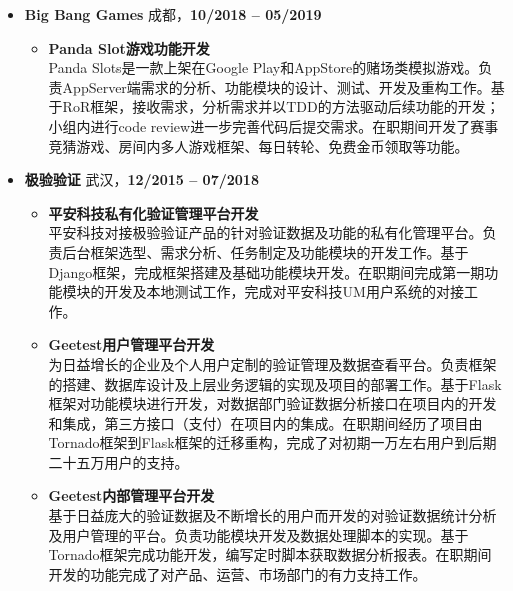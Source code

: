 \documentclass[11pt, a4paper,sans]{moderncv}     %
\begin{document}
\begin{itemize}

  \item{\yahei \textbf{Big Bang Games} \hfill 成都，\textbf{10/2018 -- 05/2019}}

  \begin{itemize}
    \item{\yahei \textbf{Panda Slot游戏功能开发}\\
    Panda Slots是一款上架在Google Play和AppStore的赌场类模拟游戏。负责AppServer端需求的分析、功能模块的设计、测试、开发及重构工作。基于RoR框架，接收需求，分析需求并以TDD的方法驱动后续功能的开发；小组内进行code review进一步完善代码后提交需求。在职期间开发了赛事竞猜游戏、房间内多人游戏框架、每日转轮、免费金币领取等功能。}
  \end{itemize}
  \vspace{6pt}

  \item{\yahei \textbf{极验验证} \hfill 武汉，\textbf{12/2015 -- 07/2018}}

  \begin{itemize}
    \item{\yahei \textbf{平安科技私有化验证管理平台开发}\\
    平安科技对接极验验证产品的针对验证数据及功能的私有化管理平台。负责后台框架选型、需求分析、任务制定及功能模块的开发工作。基于Django框架，完成框架搭建及基础功能模块开发。在职期间完成第一期功能模块的开发及本地测试工作，完成对平安科技UM用户系统的对接工作。}

    \item{\yahei \textbf{Geetest用户管理平台开发}\\
    为日益增长的企业及个人用户定制的验证管理及数据查看平台。负责框架的搭建、数据库设计及上层业务逻辑的实现及项目的部署工作。基于Flask框架对功能模块进行开发，对数据部门验证数据分析接口在项目内的开发和集成，第三方接口（支付）在项目内的集成。在职期间经历了项目由Tornado框架到Flask框架的迁移重构，完成了对初期一万左右用户到后期二十五万用户的支持。}

    \item{\yahei \textbf{Geetest内部管理平台开发}\\
    基于日益庞大的验证数据及不断增长的用户而开发的对验证数据统计分析及用户管理的平台。负责功能模块开发及数据处理脚本的实现。基于Tornado框架完成功能开发，编写定时脚本获取数据分析报表。在职期间开发的功能完成了对产品、运营、市场部门的有力支持工作。}
  \end{itemize}

\end{itemize}
\vspace{-8pt}
\end{document}
